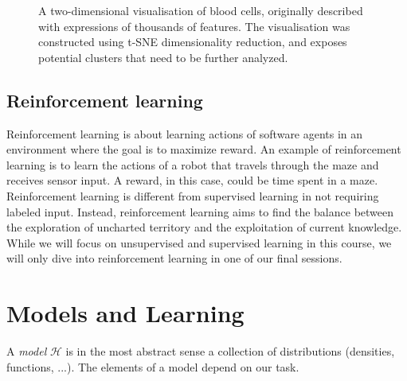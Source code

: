 \begin{refsection}
\begin{figure}[htbp]
\caption{A two-dimensional visualisation of blood cells, originally described with expressions of thousands of features. The visualisation was constructed using t-SNE dimensionality reduction, and exposes potential clusters that need to be further analyzed.}
\label{fig:tsne-sc}
\end{figure}

\subsection*{Reinforcement learning}

Reinforcement learning is about learning actions of software agents in an environment where the goal is to maximize reward. An example of reinforcement learning is to learn the actions of a robot that travels through the maze and receives sensor input. A reward, in this case, could be time spent in a maze. Reinforcement learning is different from supervised learning in not requiring labeled input. Instead, reinforcement learning aims to find the balance between the exploration of uncharted territory and the exploitation of current knowledge. While we will focus on unsupervised and supervised learning in this course, we will only dive into reinforcement learning in one of our final sessions.


\section{Models and Learning}

A {\em model} $\mathcal{H}$ is in the most abstract sense a collection of distributions (densities, functions, ...). The elements of a model depend on our task.


\end{refsection}
